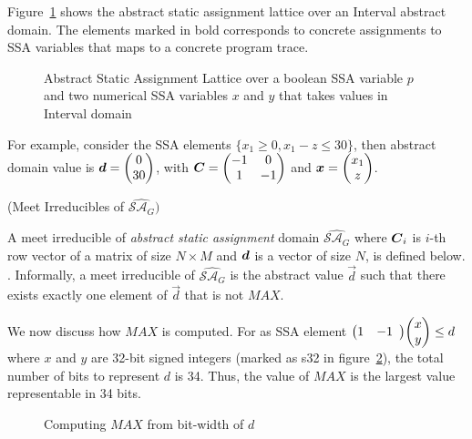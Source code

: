 %
Figure~\ref{fig:abstract} shows the abstract static assignment lattice over an
Interval abstract domain.  The elements marked in bold corresponds to concrete 
assignments to SSA variables that maps to a concrete program trace. 
%
\begin{figure}[htbp]
\centering
\vspace*{-0.2cm}
\caption{Abstract Static Assignment Lattice over a boolean SSA variable $p$ and two
  numerical SSA variables $x$ and $y$ that takes values in Interval domain
  \label{fig:abstract}}
\end{figure}
%
\begin{example}
For example, consider the SSA elements $\{x_1\geq 0, x_1-z\leq 30\}$, then
abstract domain value is $\vec{\numabsval}=\vecv{0}{30}$,
with $\mat{C}=\qmat{-1}{0}{1}{-1}$ and $\vec{\numvar}=\vecv{x_1}{z}$. \\ 
\end{example}
%
\begin{definition} (Meet Irreducibles of $\widehat{\mathcal{SA}_G})$
%

A meet irreducible of \emph{abstract static assignment} domain
$\widehat{\mathcal{SA}_{G}}$ where ${\boldsymbol C_i}$ is $i$-th row vector  
of a matrix of size $N \times M$ and $\vec{\numabsval}$ is a vector 
  of size $N$, is defined below.  .
%   
\rmcmt{
  \[
     \meet_{irrd}(\widehat{\mathcal{SA}_{G}}) \mathrel{\hat=} 
     \{\vec{d} \mid \exists_{=1}\;d_i \in \vec{\numabsval}.\;(d_i \neq MAX) \wedge
     C_{i}\vec{x} \leq d_i\} \;\text{where}\;(i \leq N)
  \]
}  
Informally, a meet irreducible of $\widehat{\mathcal{SA}_{G}}$ is the abstract
value $\vec{d}$ such that there exists exactly one element of $\vec{d}$ that is
not $MAX$.
%
\end{definition}
%
We now discuss how $MAX$ is computed.  For as SSA element 
$\hmat{1}{-1} \vecv{x}{y} \leq d$ where $x$ and $y$ are 
32-bit signed integers (marked as s32 in figure~\ref{fig:max}), 
the total number of bits to represent $d$ is 34.  Thus, the 
value of $MAX$ is the largest value representable in 34 bits.
%
\begin{figure}[htbp]
\centering
\vspace*{-0.2cm}
\caption{Computing $MAX$ from bit-width of $d$
  \label{fig:max}}
\end{figure}
%


